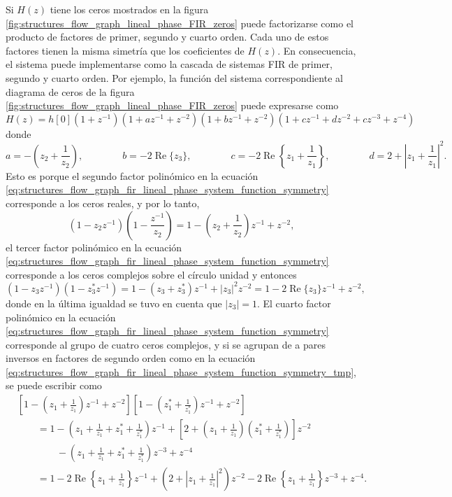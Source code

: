\documentclass[a4paper]{report}
\renewcommand{\Re}{\operatorname{Re}}
\begin{document}
Si \(H(z)\) tiene los ceros mostrados en la figura \ref{fig:structures_flow_graph_lineal_phase_FIR_zeros} puede factorizarse como el producto de factores de primer, segundo y cuarto orden. Cada uno de estos factores tienen la misma simetría que los coeficientes de \(H(z)\). En consecuencia, el sistema puede implementarse como la cascada de sistemas FIR de primer, segundo y cuarto orden. Por ejemplo, la función del sistema correspondiente al diagrama de ceros de la figura \ref{fig:structures_flow_graph_lineal_phase_FIR_zeros} puede expresarse como
\begin{equation}\label{eq:structures_flow_graph_fir_lineal_phase_system_function_symmetry}
 H(z)=h[0](1+z^{-1})(1+az^{-1}+z^{-2})(1+bz^{-1}+z^{-2})(1+cz^{-1}+dz^{-2}+cz^{-3}+z^{-4}) 
\end{equation}
donde
\[
 a=-\left(z_2+\frac{1}{z_2}\right),
 \qquad\qquad
 b=-2\Re\{z_3\},
 \qquad\qquad
 c=-2\Re\left\{z_1+\frac{1}{z_1}\right\},
 \qquad\qquad
 d=2+\left|z_1+\frac{1}{z_1}\right|^2.
\]
Esto es porque el segundo factor polinómico en la ecuación \ref{eq:structures_flow_graph_fir_lineal_phase_system_function_symmetry} corresponde a los ceros reales, y por lo tanto,
\begin{equation}\label{eq:structures_flow_graph_fir_lineal_phase_system_function_symmetry_tmp}
 (1-z_2z^{-1})\left(1-\frac{z^{-1}}{z_2}\right)=1-\left(z_2+\frac{1}{z_2}\right)z^{-1}+z^{-2}, 
\end{equation}
el tercer factor polinómico en la ecuación \ref{eq:structures_flow_graph_fir_lineal_phase_system_function_symmetry} corresponde a los ceros complejos sobre el círculo unidad y entonces
\[
 (1-z_3z^{-1})(1-z_3^*z^{-1})=1-(z_3+z_3^*)z^{-1}+|z_3|^2z^{-2}=1-2\Re\{z_3\}z^{-1}+z^{-2},
\]
donde en la última igualdad se tuvo en cuenta que \(|z_3|=1\). El cuarto factor polinómico en la ecuación \ref{eq:structures_flow_graph_fir_lineal_phase_system_function_symmetry} corresponde al grupo de cuatro ceros complejos, y si se agrupan de a pares inversos en factores de segundo orden como en la ecuación \ref{eq:structures_flow_graph_fir_lineal_phase_system_function_symmetry_tmp}, se puede escribir como
\begin{align*}
 &\left[1-\left(z_1+\frac{1}{z_1}\right)z^{-1}+z^{-2}\right]\left[1-\left(z_1^*+\frac{1}{z_1^*}\right)z^{-1}+z^{-2}\right]\\
 &\qquad=1-\left(z_1+\frac{1}{z_1}+z_1^*+\frac{1}{z_1^*}\right)z^{-1}+\left[2+\left(z_1+\frac{1}{z_1}\right)\left(z_1^*+\frac{1}{z_1^*}\right)\right]z^{-2}\\
 &\qquad\qquad-\left(z_1+\frac{1}{z_1}+z_1^*+\frac{1}{z_1^*}\right)z^{-3}+z^{-4}\\
 &\qquad=1-2\Re\left\{z_1+\frac{1}{z_1}\right\}z^{-1}+\left(2+\left|z_1+\frac{1}{z_1}\right|^2\right)z^{-2}-2\Re\left\{z_1+\frac{1}{z_1}\right\}z^{-3}+z^{-4}.
\end{align*}
\end{document}
